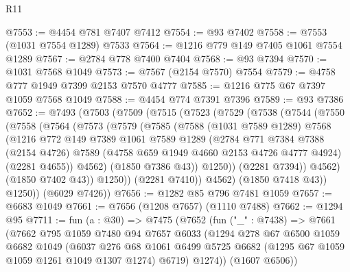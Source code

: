 \begin{lexlean}{R11}
\begin{coremodule}
@7553 := @4454 @781 @7407 @7412
@7554 := @93 @7402
@7558 := @7553 (@1031 @7554 @1289) @7533
@7564 := @1216 @779 @149 @7405 @1061 @7554 @1289
@7567 := @2784 @778 @7400 @7404
@7568 := @93 @7394
@7570 := @1031 @7568 @1049
@7573 := @7567 (@2154 @7570) @7554
@7579 := @4758 @777 @1949 @7399 @2153 @7570 @4777
@7585 := @1216 @775 @67 @7397 @1059 @7568 @1049
@7588 := @4454 @774 @7391 @7396
@7589 := @93 @7386
@7652 := @7493
    (@7503
      (@7509
        (@7515
          (@7523
            (@7529
              (@7538
                (@7544
                  (@7550
                    (@7558
                      (@7564
                        (@7573
                          (@7579
                            (@7585
                              (@7588
                                (@1031 @7589 @1289)
                                @7568
                                (@1216
                                  @772
                                  @149
                                  @7389
                                  @1061
                                  @7589
                                  @1289
                                  (@2784
                                    @771
                                    @7384
                                    @7388
                                    (@2154 @4726)
                                    @7589
                                    (@4758 @659 @1949 @4660 @2153 @4726 @4777 @4924)
                                    (@2281 @4655))
                                  @4562)
                                (@1850 @7386 @43))
                              @1250))
                          (@2281 @7394))
                        @4562)
                      (@1850 @7402 @43))
                    @1250))
                (@2281 @7410))
              @4562)
            (@1850 @7418 @43))
          @1250))
      (@6029 @7426))
@7656 := @1282 @85 @796 @7481 @1059
@7657 := @6683 @1049
@7661 := @7656 (@1208 @7657) (@1110 @7488)
@7662 := @1294 @95
@7711 := fun (a : @30) =>
  @7475
    (@7652
      (fun ("_" : @7438) =>
      @7661
        (@7662
          @795
          @1059
          @7480
          @94
          @7657
          @6033
          (@1294
            @278
            @67
            @6500
            @1059
            @6682
            @1049
            (@6037
              @276
              @68
              @1061
              @6499
              @5725
              @6682
              (@1295 @67 @1059 @1059 @1261 @1049 @1307 @1274)
              @6719)
            @1274))
        (@1607 @6506))

\end{coremodule}
\end{lexlean}
